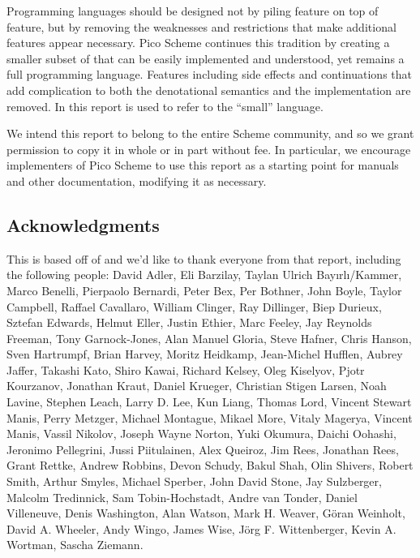 
\label{historysection}

Programming languages should be designed not by piling feature on top
of feature, but by removing the weaknesses and restrictions that make
additional features appear necessary.  Pico Scheme continues this
tradition by creating a smaller subset of \rsevenrs{} that can be easily
implemented and understood, yet remains a full programming
language. Features including side effects and continuations that add
complication to both the denotational semantics and the implementation
are removed. In this report \rsevenrs{} is used to refer to the ``small''
language.



\medskip

We intend this report to belong to the entire Scheme community, and so
we grant permission to copy it in whole or in part without fee.  In
particular, we encourage implementers of Pico Scheme to use this report as
a starting point for manuals and other documentation, modifying it as
necessary.



\subsection*{Acknowledgments}

This is based off of \rsevenrs{} and we'd like to thank everyone from
that report, including the following people: David Adler, Eli
Barzilay, Taylan Ulrich Bay\i{}rl\i/Kammer, Marco Benelli, Pierpaolo
Bernardi, Peter Bex, Per Bothner, John Boyle, Taylor Campbell, Raffael
Cavallaro, William Clinger, Ray Dillinger, Biep Durieux, Sztefan
Edwards, Helmut Eller, Justin Ethier, Marc Feeley, Jay Reynolds
Freeman, Tony Garnock-Jones, Alan Manuel Gloria, Steve Hafner, Chris
Hanson, Sven Hartrumpf, Brian Harvey, Moritz Heidkamp, Jean-Michel
Hufflen, Aubrey Jaffer, Takashi Kato, Shiro Kawai, Richard Kelsey,
Oleg Kiselyov, Pjotr Kourzanov, Jonathan Kraut, Daniel Krueger,
Christian Stigen Larsen, Noah Lavine, Stephen Leach, Larry D. Lee, Kun
Liang, Thomas Lord, Vincent Stewart Manis, Perry Metzger, Michael
Montague, Mikael More, Vitaly Magerya, Vincent Manis, Vassil Nikolov,
Joseph Wayne Norton, Yuki Okumura, Daichi Oohashi, Jeronimo
Pellegrini, Jussi Piitulainen, Alex Queiroz, Jim Rees, Jonathan Rees,
Grant Rettke, Andrew Robbins, Devon Schudy, Bakul Shah, Olin Shivers,
Robert Smith, Arthur Smyles, Michael Sperber, John David Stone, Jay
Sulzberger, Malcolm Tredinnick, Sam Tobin-Hochstadt, Andre van Tonder,
Daniel Villeneuve, Denis Washington, Alan Watson, Mark H.  Weaver,
G\"oran Weinholt, David A. Wheeler, Andy Wingo, James Wise, J\"org
F. Wittenberger, Kevin A. Wortman, Sascha Ziemann.

